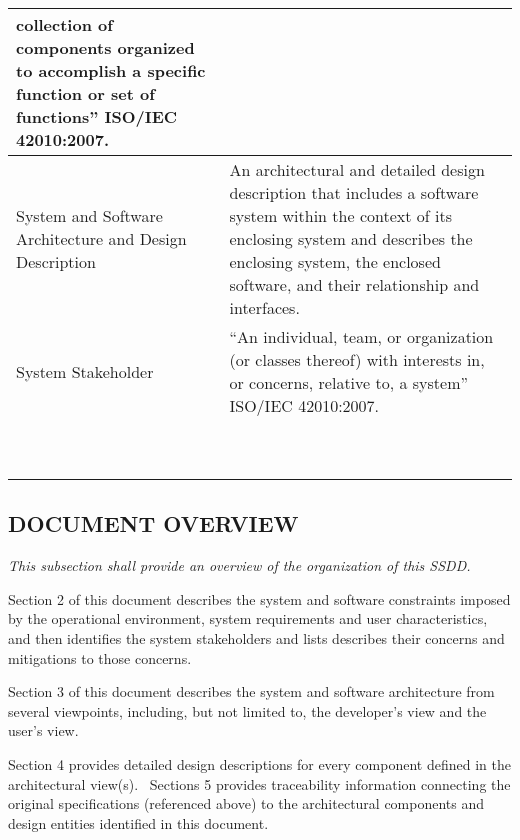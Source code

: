 \documentclass[twoside,letterpaper]{article}
\begin{document}
\begin{flushleft}
\begin{supertabular}{|m{1.3587599in}|m{5.00806in}|}
{collection of components organized to accomplish a specific function or
set of functions{\textquotedblright} ISO/IEC 42010:2007.}\\\hline
{}\color{black} System and Software Architecture
and Design Description &
\color{black} An architectural and detailed
design description that includes a software system within the context
of its enclosing system and describes the enclosing system, the
enclosed software, and their relationship and interfaces.\\\hline
{}\color{black} System Stakeholder &
\color{black}
\foreignlanguage{english}{{\textquotedblleft}}\foreignlanguage{english}{An
individual, team, or organization (or classes thereof) with interests
in, or concerns, relative to, a system{\textquotedblright} ISO/IEC
42010:2007.}\\\hline
~
 &
~
\\\hline
~
 &
~
\\\hline
\end{supertabular}
\end{flushleft}

\subsection{DOCUMENT OVERVIEW}
{\itshape\color{black}
This subsection shall provide an overview of the organization of this
SSDD.}

\noindent
Section 2 of this document describes the system and software constraints
imposed by the operational environment, system requirements and user
characteristics, and then identifies the system stakeholders and lists
describes their concerns and mitigations to those concerns.

\smallskip

\noindent
Section 3 of this document describes the system and software
architecture from several viewpoints, including, but not limited to,
the developer{\textquoteright}s view and the user{\textquoteright}s
view.

\smallskip

\noindent
Section 4 provides detailed design descriptions for every component
defined in the architectural view(s). \ Sections 5 provides
traceability information connecting the original specifications
(referenced above) to the architectural components and design entities
identified in this document.
\end{document}
